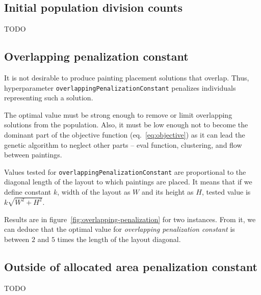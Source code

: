 \subsection{Initial population division counts}\label{subsec:initial-population-division-counts}
TODO

\subsection{Overlapping penalization constant}\label{subsec:overlapping-penalization-constant}

It is not desirable to produce painting placement solutions that overlap.
Thus, hyperparameter \verb|overlappingPenalizationConstant| penalizes
individuals representing such a solution.

The optimal value must be strong enough to remove or limit overlapping solutions from the population.
Also, it must be low enough not to become the dominant part of the objective function (eq.~\ref{eq:objective})
as it can lead the genetic algorithm to neglect other parts – eval function, clustering, and flow between paintings.

Values tested for \verb|overlappingPenalizationConstant| are proportional to the diagonal
length of the layout to which paintings are placed.
It means that if we define constant $k$, width of the layout as $W$ and its height as $H$,
tested value is $k\sqrt{W^2 + H^2}$.

Results are in figure~\ref{fig:overlapping-penalization} for two instances.
From it, we can deduce that the optimal value for \textit{overlapping penalization constant} is between $2$ and $5$ times the length of the layout diagonal.

\subsection{Outside of allocated area penalization constant}\label{subsec:outside-of-allocated-area-penalization-constant}
TODO




